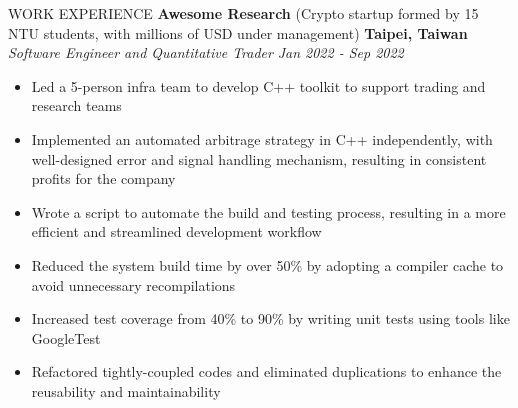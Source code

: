 \documentclass{resume} %
\begin{document}

\begin{rSection}{WORK EXPERIENCE} 
\textbf{Awesome Research} {(Crypto startup formed by 15 NTU students, with millions of USD under management)} \hfill \textbf{Taipei, Taiwan} \\  
\textit{Software Engineer and Quantitative Trader}  \hfill \textit{Jan 2022 - Sep 2022} 
    \begin{itemize}
        \item Led a 5-person infra team to develop C++ toolkit to support trading and research teams 
        \item Implemented an automated arbitrage strategy in C++ independently, with well-designed error and signal handling mechanism, resulting in consistent profits for the company 
        \item Wrote a script to automate the build and testing process, resulting in a more efficient and streamlined development workflow
        \item Reduced the system build time by over 50\% by adopting a compiler cache to avoid unnecessary recompilations
        \item Increased test coverage from 40\% to 90\% by writing unit tests using tools like GoogleTest
        \item Refactored tightly-coupled codes and eliminated duplications to enhance the reusability and maintainability
    \end{itemize}




    
\end{rSection} 
\end{document}
